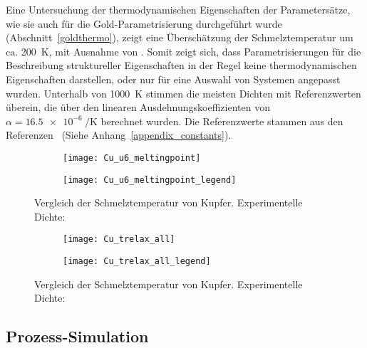 Eine Untersuchung der thermodynamischen Eigenschaften der Parametersätze, wie sie auch für die Gold-Parametrisierung durchgeführt wurde (Abschnitt~\ref{goldthermo}), zeigt eine Überschätzung der Schmelztemperatur um ca. \SI{200}{\kelvin}, mit Ausnahme von .
Somit zeigt sich, dass Parametrisierungen für die Beschreibung struktureller Eigenschaften in der Regel keine thermodynamischen Eigenschaften darstellen, oder nur für eine Auswahl von Systemen angepasst wurden.
Unterhalb von \SI{1000}{\kelvin} stimmen die meisten Dichten mit Referenzwerten überein, die über den linearen Ausdehnungskoeffizienten von $\alpha = \SI{16.5e-6}{\per\kelvin}$\cite{haynes_crc_2011} berechnet wurden.
Die Referenzwerte stammen aus den Referenzen~\cite{haynes_crc_2011,brillo_density_2006} (Siehe Anhang~\ref{appendix_constants}).

\begin{figure}[H]
  \centering
  \captionsetup[subfigure]{singlelinecheck=false}
  \begin{subfigure}[c]{10cm}
    \texttt{[image: Cu\_u6\_meltingpoint]}
  \end{subfigure}
  \begin{subfigure}[c]{4cm}
    \texttt{[image: Cu\_u6\_meltingpoint\_legend]}
    \vspace{1.5em}
  \end{subfigure}
  \hfill
  \caption[Vergleich der Schmelztemperatur von Kupfer]{
    Vergleich der Schmelztemperatur von Kupfer.
    Experimentelle Dichte:~\cite{brillo_density_2006}
  }
  \label{fig:copperthermo}
\end{figure}

\begin{figure}[H]
  \centering
  \captionsetup[subfigure]{singlelinecheck=false}
  \begin{subfigure}[c]{9.4cm}
    \texttt{[image: Cu\_trelax\_all]}
  \end{subfigure}
  \begin{subfigure}[c]{4.7cm}
    \texttt{[image: Cu\_trelax\_all\_legend]}
    \vspace{1.5em}
  \end{subfigure}
  \hfill
  \caption[Vergleich der Schmelztemperatur von Kupfer]{
    Vergleich der Schmelztemperatur von Kupfer.
    Experimentelle Dichte:~\cite{brillo_density_2006}
  }
  \label{fig:copperthermo}
\end{figure}

\subsection{Prozess-Simulation}
\label{coppersimulation}

